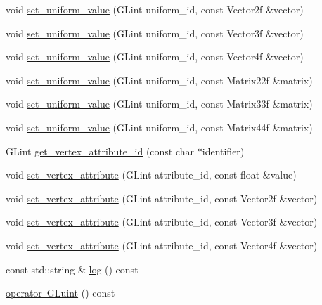 \begin{DoxyCompactItemize}
\item 
void \mbox{\hyperlink{classexample_1_1_shader___program_a91b8b17fda08bc9f1b6c94bfe8c4f8d3}{set\+\_\+uniform\+\_\+value}} (G\+Lint uniform\+\_\+id, const Vector2f \&vector)
\item 
void \mbox{\hyperlink{classexample_1_1_shader___program_a4cf2fdc503438ec1d4d97aa6cd3c2ee7}{set\+\_\+uniform\+\_\+value}} (G\+Lint uniform\+\_\+id, const Vector3f \&vector)
\item 
void \mbox{\hyperlink{classexample_1_1_shader___program_a2a2c6ff8951da9673abe325af811fafa}{set\+\_\+uniform\+\_\+value}} (G\+Lint uniform\+\_\+id, const Vector4f \&vector)
\item 
void \mbox{\hyperlink{classexample_1_1_shader___program_a01a9e5843a65dd8e58f70762970e88c2}{set\+\_\+uniform\+\_\+value}} (G\+Lint uniform\+\_\+id, const Matrix22f \&matrix)
\item 
void \mbox{\hyperlink{classexample_1_1_shader___program_aff80e9ffddea9450a6f79320ac53e085}{set\+\_\+uniform\+\_\+value}} (G\+Lint uniform\+\_\+id, const Matrix33f \&matrix)
\item 
void \mbox{\hyperlink{classexample_1_1_shader___program_a8ed8144f9d999bf09e774a4919a449f2}{set\+\_\+uniform\+\_\+value}} (G\+Lint uniform\+\_\+id, const Matrix44f \&matrix)
\item 
G\+Lint \mbox{\hyperlink{classexample_1_1_shader___program_ae0539221bf0626e303c7138b2f4764a0}{get\+\_\+vertex\+\_\+attribute\+\_\+id}} (const char $\ast$identifier)
\item 
void \mbox{\hyperlink{classexample_1_1_shader___program_a3f3c9e0b56278a38b467a50a8e52d396}{set\+\_\+vertex\+\_\+attribute}} (G\+Lint attribute\+\_\+id, const float \&value)
\item 
void \mbox{\hyperlink{classexample_1_1_shader___program_adc75685af2153c0b509722f6ca780c0d}{set\+\_\+vertex\+\_\+attribute}} (G\+Lint attribute\+\_\+id, const Vector2f \&vector)
\item 
void \mbox{\hyperlink{classexample_1_1_shader___program_ae02dbec6468a93f30db194d40a1fd518}{set\+\_\+vertex\+\_\+attribute}} (G\+Lint attribute\+\_\+id, const Vector3f \&vector)
\item 
void \mbox{\hyperlink{classexample_1_1_shader___program_a9629fefd3e83e7c0f9ff52589e341393}{set\+\_\+vertex\+\_\+attribute}} (G\+Lint attribute\+\_\+id, const Vector4f \&vector)
\item 
const std\+::string \& \mbox{\hyperlink{classexample_1_1_shader___program_a9f1bd162f1a3eede5b8c685a830b4021}{log}} () const
\item 
\mbox{\hyperlink{classexample_1_1_shader___program_a0c9b4a8eca4fa15682d92c29801d55f1}{operator G\+Luint}} () const
\end{DoxyCompactItemize}
